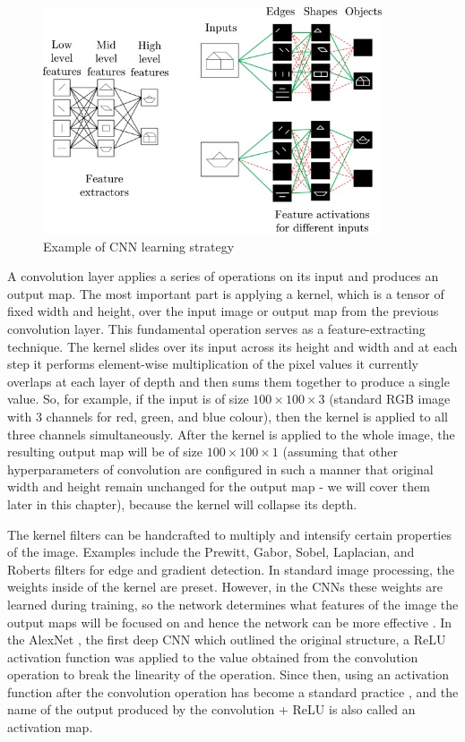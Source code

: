 \begin{figure}[H]
\begin{centering}
\includegraphics[width=10cm]{assets/images/cnn.jpg}
\par\end{centering}
\caption{Example of CNN learning strategy \cite{Santosh2022-2}}
\label{fig:cnn}
\end{figure}

A convolution layer applies a series of operations on its input and produces an output map. The most important part is applying a kernel, which is a tensor of fixed width and height, over the input image or output map from the previous convolution layer. This fundamental operation serves as a feature-extracting technique. The kernel slides over its input across its height and width and at each step it performs element-wise multiplication of the pixel values it currently overlaps at each layer of depth and then sums them together to produce a single value. So, for example, if the input is of size $100\!\times\!100\!\times\!3$ (standard RGB image with 3 channels for red, green, and blue colour), then the kernel is applied to all three channels simultaneously. After the kernel is applied to the whole image, the resulting output map will be of size $100\!\times\!100\!\times\!1$ (assuming that other hyperparameters of convolution are configured in such a manner that original width and height remain unchanged for the output map - we will cover them later in this chapter), because the kernel will collapse its depth. 

The kernel filters can be handcrafted to multiply and intensify certain properties of the image. Examples include the Prewitt, Gabor, Sobel, Laplacian, and Roberts filters for edge and gradient detection. In standard image processing, the weights inside of the kernel are preset. However, in the CNNs these weights are learned during training, so the network determines what features of the image the output maps will be focused on and hence the network can be more effective \cite{Santosh2022-2, He2023}. In the AlexNet \cite{Krizhevsky2012}, the first deep CNN which outlined the original structure, a ReLU activation function was applied to the value obtained from the convolution operation to break the linearity of the operation. Since then, using an activation function after the convolution operation has become a standard practice \cite{Santosh2022-2, He2023}, and the name of the output produced by the convolution + ReLU is also called an activation map.

